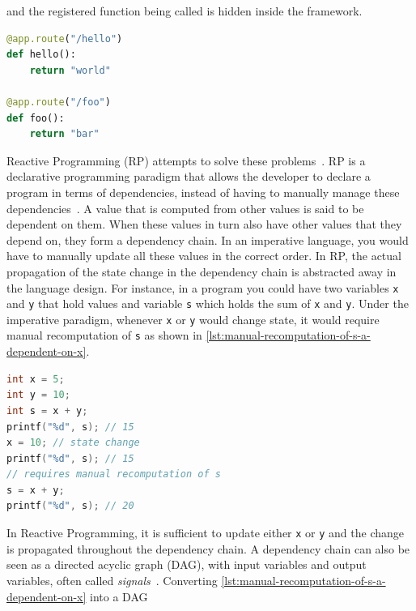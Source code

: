 \documentclass[a4paper]{book}
\begin{document}
and the registered function being called is hidden inside the framework.
\begin{listing}[ht]
	\centering
		\begin{lstlisting}[language=Python]
@app.route("/hello")
def hello():
    return "world"

@app.route("/foo")
def foo():
    return "bar"\end{lstlisting}
		\caption{Inversion of control in Python, using the Flask web
			framework}
		\label{lst:inversion-of-control-python}
\end{listing}
\par
Reactive Programming (RP) attempts to solve these problems~\cite{surveyRP2024}.
RP is a declarative programming paradigm that allows the developer to declare a
program in terms of dependencies, instead of having to manually manage these
dependencies~\cite{surveyRP2024}. A value that is computed from other values is
said to be dependent on them. When these values in turn also have other values
that they depend on, they form a dependency chain. In an imperative language,
you would have to manually update all these values in the correct order. In RP,
the actual propagation of the state change in the dependency chain is abstracted
away in the language design. For instance, in a program you could have two
variables \texttt{x} and \texttt{y} that hold values and variable \texttt{s}
which holds the sum of \texttt{x} and \texttt{y}. Under the imperative paradigm,
whenever \texttt{x} or \texttt{y} would change state, it would require manual
recomputation of \texttt{s} as shown in
\cref{lst:manual-recomputation-of-s-a-dependent-on-x}.
\begin{listing}[ht]
	\begin{lstlisting}[language=C]
int x = 5;
int y = 10;
int s = x + y;
printf("%d", s); // 15
x = 10; // state change
printf("%d", s); // 15
// requires manual recomputation of s
s = x + y;
printf("%d", s); // 20
\end{lstlisting}
    \caption{Manual recomputation of \texttt{s} in C}
	\label{lst:manual-recomputation-of-s-a-dependent-on-x}
\end{listing}
\par
In Reactive Programming, it is sufficient to update either \texttt{x} or
\texttt{y} and the change is propagated throughout the dependency chain. A
dependency chain can also be seen as a directed acyclic graph (DAG), with input
variables and output variables, often called \emph{signals}~\cite{surveyRP2024}.
Converting \cref{lst:manual-recomputation-of-s-a-dependent-on-x} into a DAG
\end{document}

